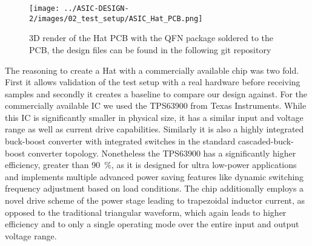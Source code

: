 \begin{figure}[h]
    \centering
    \texttt{[image: ../ASIC-DESIGN-2/images/02\_test\_setup/ASIC\_Hat\_PCB.png]}
    \caption{3D render of the Hat PCB with the QFN package soldered to the PCB, the design files can be found in the following git repository \cite{PCB_schematic}}
    \label{fig:ASIC_Hat}
\end{figure}


The reasoning to create a Hat with a commercially available chip was two fold. First it allows validation of the test setup with a real hardware before receiving samples and secondly it creates a baseline to compare our design against. For the commercially available \ac{IC} we used the TPS63900 from Texas Instruments. While this \ac{IC} is significantly smaller in physical size, it has a similar input and voltage range as well as current drive capabilities. Similarly it is also a highly integrated buck-boost converter with integrated switches in the standard cascaded-buck-boost converter topology. Nonetheless the TPS63900 has a significantly higher efficiency, greater than \qty{90}{\percent}\cite{tps63900}, as it is designed for ultra low-power applications and implements multiple advanced power saving features like dynamic switching frequency adjustment based on load conditions\cite{tps63900}. The chip additionally employs a novel drive scheme of the power stage leading to trapezoidal inductor current, as opposed to the traditional triangular waveform, which again leads to higher efficiency and to only a single operating mode over the entire input and output voltage range\cite{tps63900}. 